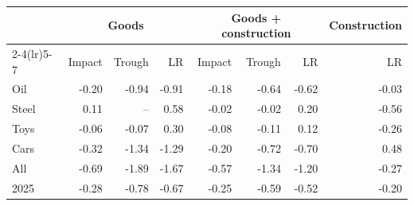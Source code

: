 \begin{tabular}{lrrrrrrr}
\toprule
 & \multicolumn{3}{c}{Goods} & \multicolumn{3}{c}{Goods + construction} & Construction \\
\cmidrule(lr){2-4}\cmidrule(lr){5-7}
 & Impact & Trough & LR & Impact & Trough & LR & LR \\
\midrule
Oil & -0.20 & -0.94 & -0.91 & -0.18 & -0.64 & -0.62 & -0.03 \\
Steel & 0.11 & -- & 0.58 & -0.02 & -0.02 & 0.20 & -0.56 \\
Toys & -0.06 & -0.07 & 0.30 & -0.08 & -0.11 & 0.12 & -0.26 \\
Cars & -0.32 & -1.34 & -1.29 & -0.20 & -0.72 & -0.70 & 0.48 \\
All & -0.69 & -1.89 & -1.67 & -0.57 & -1.34 & -1.20 & -0.27 \\
2025 & -0.28 & -0.78 & -0.67 & -0.25 & -0.59 & -0.52 & -0.20 \\
\bottomrule
\end{tabular}
